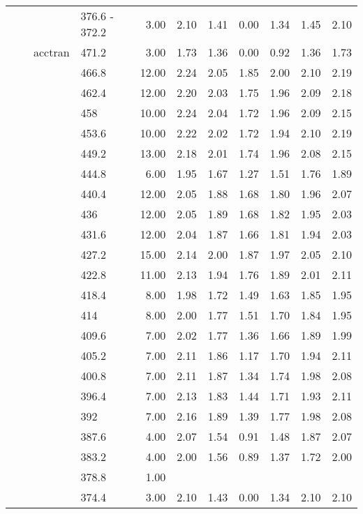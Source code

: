 \begin{longtable}{llllrrrrrrr}
   &  &  & 376.6 - 372.2 & 3.00 & 2.10 & 1.41 & 0.00 & 1.34 & 1.45 & 2.10 \\ 
   &  & acctran & 471.2 & 3.00 & 1.73 & 1.36 & 0.00 & 0.92 & 1.36 & 1.73 \\ 
   &  &  & 466.8 & 12.00 & 2.24 & 2.05 & 1.85 & 2.00 & 2.10 & 2.19 \\ 
   &  &  & 462.4 & 12.00 & 2.20 & 2.03 & 1.75 & 1.96 & 2.09 & 2.18 \\ 
   &  &  & 458 & 10.00 & 2.24 & 2.04 & 1.72 & 1.96 & 2.09 & 2.15 \\ 
   &  &  & 453.6 & 10.00 & 2.22 & 2.02 & 1.72 & 1.94 & 2.10 & 2.19 \\ 
   &  &  & 449.2 & 13.00 & 2.18 & 2.01 & 1.74 & 1.96 & 2.08 & 2.15 \\ 
   &  &  & 444.8 & 6.00 & 1.95 & 1.67 & 1.27 & 1.51 & 1.76 & 1.89 \\ 
   &  &  & 440.4 & 12.00 & 2.05 & 1.88 & 1.68 & 1.80 & 1.96 & 2.07 \\ 
   &  &  & 436 & 12.00 & 2.05 & 1.89 & 1.68 & 1.82 & 1.95 & 2.03 \\ 
   &  &  & 431.6 & 12.00 & 2.04 & 1.87 & 1.66 & 1.81 & 1.94 & 2.03 \\ 
   &  &  & 427.2 & 15.00 & 2.14 & 2.00 & 1.87 & 1.97 & 2.05 & 2.10 \\ 
   &  &  & 422.8 & 11.00 & 2.13 & 1.94 & 1.76 & 1.89 & 2.01 & 2.11 \\ 
   &  &  & 418.4 & 8.00 & 1.98 & 1.72 & 1.49 & 1.63 & 1.85 & 1.95 \\ 
   &  &  & 414 & 8.00 & 2.00 & 1.77 & 1.51 & 1.70 & 1.84 & 1.95 \\ 
   &  &  & 409.6 & 7.00 & 2.02 & 1.77 & 1.36 & 1.66 & 1.89 & 1.99 \\ 
   &  &  & 405.2 & 7.00 & 2.11 & 1.86 & 1.17 & 1.70 & 1.94 & 2.11 \\ 
   &  &  & 400.8 & 7.00 & 2.11 & 1.87 & 1.34 & 1.74 & 1.98 & 2.08 \\ 
   &  &  & 396.4 & 7.00 & 2.13 & 1.83 & 1.44 & 1.71 & 1.93 & 2.11 \\ 
   &  &  & 392 & 7.00 & 2.16 & 1.89 & 1.39 & 1.77 & 1.98 & 2.08 \\ 
   &  &  & 387.6 & 4.00 & 2.07 & 1.54 & 0.91 & 1.48 & 1.87 & 2.07 \\ 
   &  &  & 383.2 & 4.00 & 2.00 & 1.56 & 0.89 & 1.37 & 1.72 & 2.00 \\ 
   &  &  & 378.8 & 1.00 &  &  &  &  &  &  \\ 
   &  &  & 374.4 & 3.00 & 2.10 & 1.43 & 0.00 & 1.34 & 2.10 & 2.10 \\ 

\end{longtable}
